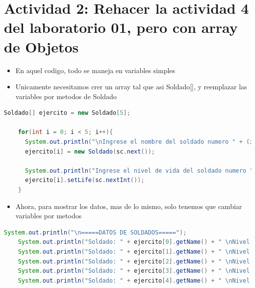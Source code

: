 \documentclass{article}
\begin{document}
\section{Actividad 2: Rehacer la actividad 4 del laboratorio 01, pero con array de Objetos}
    \begin{itemize}
        \item En aquel codigo, todo se maneja en variables simples
        \item Unicamente necesitamos crer un array tal que asi Soldado[], y reemplazar las variables por metodos de Soldado
    \end{itemize}
        \begin{lstlisting}[language=java, caption={Array de Objetos}]
    Soldado[] ejercito = new Soldado[5];

    for(int i = 0; i < 5; i++){
      System.out.println("\nIngrese el nombre del soldado numero " + (i + 1) + ":");
      ejercito[i] = new Soldado(sc.next());

      System.out.println("Ingrese el nivel de vida del soldado numero " + (i + 1) + ":");
      ejercito[i].setLife(sc.nextInt());
    }
        \end{lstlisting}
\begin{itemize}
    \item Ahora, para mostrar los datos, mas de lo mismo, solo tenemos que cambiar variables por metodos
\end{itemize}
        \begin{lstlisting}[language=java, caption={Array de Objetos}]
    System.out.println("\n=====DATOS DE SOLDADOS=====");
    System.out.println("Soldado: " + ejercito[0].getName() + " \nNivel de vida: " + ejercito[0].getLife() + "\n");
    System.out.println("Soldado: " + ejercito[1].getName() + " \nNivel de vida: " + ejercito[1].getLife() + "\n");
    System.out.println("Soldado: " + ejercito[2].getName() + " \nNivel de vida: " + ejercito[2].getLife() + "\n");
    System.out.println("Soldado: " + ejercito[3].getName() + " \nNivel de vida: " + ejercito[3].getLife() + "\n");
    System.out.println("Soldado: " + ejercito[4].getName() + " \nNivel de vida: " + ejercito[4].getLife() + "\n");
        \end{lstlisting}
\end{document}
